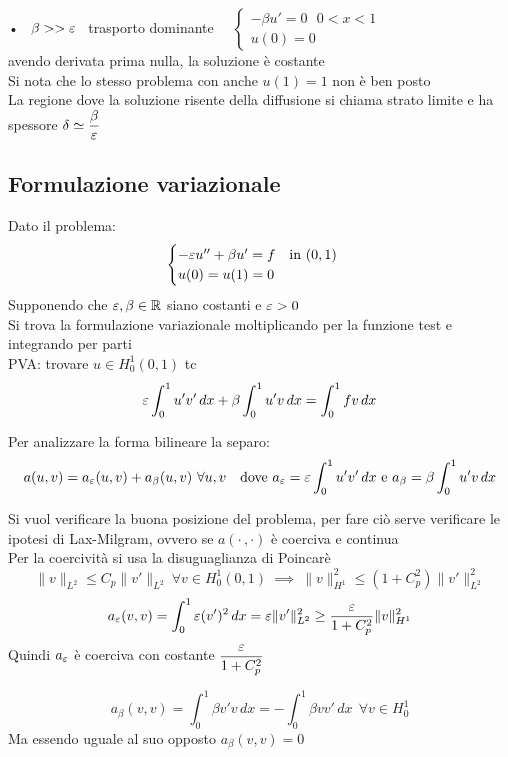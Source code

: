 \documentclass{article}
\begin{document}
• \ $\beta >> \varepsilon$ \ trasporto dominante \ \ $\begin{cases}
    -\beta u' =0 \ \ \ 0<x<1\\
    u(0)=0
\end{cases}$ \\ avendo derivata prima nulla, la soluzione è costante\\
Si nota che lo stesso problema con anche $u(1)=1$ non è ben posto\\

La regione dove la soluzione risente della diffusione si chiama strato limite e ha spessore $\delta \simeq \dfrac{\beta}{\varepsilon}$\\

\subsection{Formulazione variazionale}

Dato il problema:
\[
\begin{cases}
    -\varepsilon u'' + \beta u' = f \ \ \text{ in } (0,1)\\
    u(0)=u(1)=0
\end{cases}
\]
Supponendo che $\varepsilon, \beta\in \mathbb R$ siano costanti e $\varepsilon>0$\\

Si trova la formulazione variazionale moltiplicando per la funzione test e integrando per parti\\

PVA: trovare $u\in H_0^1(0,1)$ tc
\[
\eps \int_0^1 u'v' \, dx + \beta \int_0^1 u' v \, dx = \int_0^1 fv \, dx
\]

Per analizzare la forma bilineare la separo: \[
a(u,v)=a_{\eps}(u,v) + a_{\beta}(u,v) \ \forall u,v \ \ \text{ dove } a_{\eps}=\eps\int_0^1u'v'\, dx \text{ e } a_{\beta}=\beta \int_0^1 u' v \, dx
\]

Si vuol verificare la buona posizione del problema, per fare ciò serve verificare le ipotesi di Lax-Milgram, ovvero se $a(\cdot\, ,\cdot)$ è coerciva e continua \\


Per la coercività si usa la disuguaglianza di Poincarè
\[
\|v\|_{L^2} \le C_p \|v'\|_{L^2} \ \forall v\in H_0^1(0,1) \ \implies \ \|v\|_{H^1}^2 \le (1+C^2_p)\|v'\|^2_{L^2}
\]
\[
a_{\eps}(v,v) = \int_0^1 \eps (v')^2\, dx = \eps \|v'\|^2_{L^2} \ge \frac{\eps}{1+C_p^2}\|v\|_{H^1}^2
\]
Quindi $a_{\varepsilon}$ è coerciva con costante $\dfrac{\varepsilon}{1+C_p^2}$

\[
a_{\beta}(v,v)=\int_0^1 \beta v'v\, dx = - \int_0^1 \beta v v'\, dx  \ \ \forall v\in H_0^1
\]
Ma essendo uguale al suo opposto $a_{\beta}(v,v)=0$\\
\end{document}
